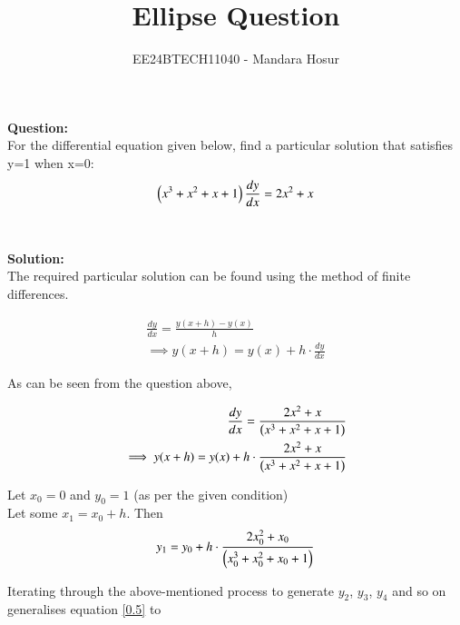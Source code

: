\documentclass[journal]{IEEEtran}
\begin{document}

\vspace{3cm}

\title{Ellipse Question}
\author{EE24BTECH11040 - Mandara Hosur}
{\let\newpage\relax\maketitle}

\renewcommand{\thefigure}{\theenumi}
\renewcommand{\thetable}{\theenumi}
\setlength{\intextsep}{10pt} %


\renewcommand{\thetable}{\theenumi}

\textbf{Question:}\\
For the differential equation given below, find a particular solution that satisfies y=1 when x=0:
$$\left(x^3 + x^2 + x + 1\right)\frac{dy}{dx} = 2x^2 + x$$
\\ \\
\textbf{Solution:} \\
The required particular solution can be found using the method of finite differences. 

\begin{align}
\frac{dy}{dx} = \frac{y(x+h) - y(x)}{h} \\
\implies y(x+h) = y(x) + h\cdot\frac{dy}{dx}
\end{align}

As can be seen from the question above,

\begin{align}
\frac{dy}{dx} = \frac{2x^2 + x}{\left(x^3 + x^2 + x + 1\right)} \\
\implies y(x+h) = y(x) + h\cdot\frac{2x^2 + x}{\left(x^3 + x^2 + x + 1\right)}
\label{0.4}
\end{align}

Let $x_0 = 0$ and $y_0 = 1$ (as per the given condition) \\
Let some $x_1 = x_0 + h$. Then
\begin{align}
y_1 = y_0 + h\cdot\frac{2x_0^2 + x_0}{\left(x_0^3 + x_0^2 + x_0 + 1\right)}
\label{0.5}
\end{align}

Iterating through the above-mentioned process to generate $y_2$, $y_3$, $y_4$ and so on generalises equation \eqref{0.5} to
\end{document}
